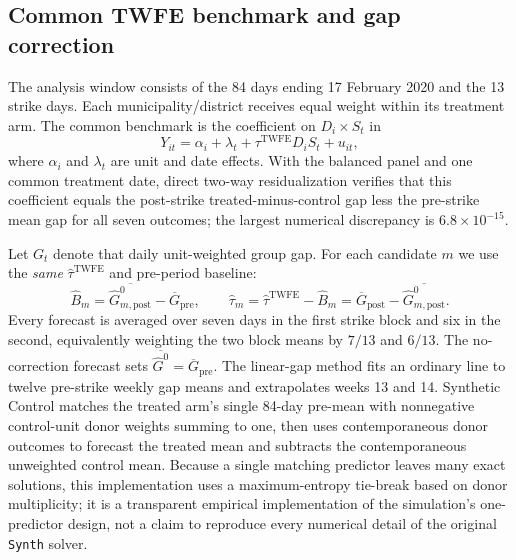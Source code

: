 \subsection{Common TWFE benchmark and gap correction}
The analysis window consists of the 84 days ending 17 February 2020 and the 13 strike days. Each municipality/district receives equal weight within its treatment arm. The common benchmark is the coefficient on $D_i\times S_t$ in
\begin{equation}\label{eq:empiricaltwfe}
Y_{it}=\alpha_i+\lambda_t+\tau^{\mathrm{TWFE}}D_iS_t+u_{it},
\end{equation}
where $\alpha_i$ and $\lambda_t$ are unit and date effects. With the balanced panel and one common treatment date, direct two-way residualization verifies that this coefficient equals the post-strike treated-minus-control gap less the pre-strike mean gap for all seven outcomes; the largest numerical discrepancy is $6.8\times10^{-15}$.

Let $G_t$ denote that daily unit-weighted group gap. For each candidate $m$ we use the \emph{same} $\widehat\tau^{\mathrm{TWFE}}$ and pre-period baseline:
\begin{equation}\label{eq:empiricalbias}
\widehat B_m=\overline{\widehat G^{0}_{m,\mathrm{post}}}-\overline G_{\mathrm{pre}},\qquad
\widehat\tau_m=\widehat\tau^{\mathrm{TWFE}}-\widehat B_m
=\overline G_{\mathrm{post}}-\overline{\widehat G^{0}_{m,\mathrm{post}}}.
\end{equation}
Every forecast is averaged over seven days in the first strike block and six in the second, equivalently weighting the two block means by $7/13$ and $6/13$. The no-correction forecast sets $\overline{\widehat G^{0}}=\overline G_{\mathrm{pre}}$. The linear-gap method fits an ordinary line to twelve pre-strike weekly gap means and extrapolates weeks 13 and 14. Synthetic Control matches the treated arm's single 84-day pre-mean with nonnegative control-unit donor weights summing to one, then uses contemporaneous donor outcomes to forecast the treated mean and subtracts the contemporaneous unweighted control mean. Because a single matching predictor leaves many exact solutions, this implementation uses a maximum-entropy tie-break based on donor multiplicity; it is a transparent empirical implementation of the simulation's one-predictor design, not a claim to reproduce every numerical detail of the original \texttt{Synth} solver.


